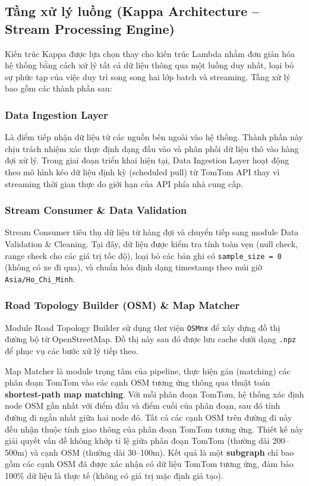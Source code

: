 \subsection{Tầng xử lý luồng (Kappa Architecture -- Stream Processing Engine)}

Kiến trúc Kappa được lựa chọn thay cho kiến trúc Lambda nhằm đơn giản hóa hệ thống bằng cách xử lý tất cả dữ liệu thông qua một luồng duy nhất, loại bỏ sự phức tạp của việc duy trì song song hai lớp batch và streaming. Tầng xử lý bao gồm các thành phần sau:

\subsubsection{Data Ingestion Layer}
Là điểm tiếp nhận dữ liệu từ các nguồn bên ngoài vào hệ thống. Thành phần này chịu trách nhiệm xác thực định dạng đầu vào và phân phối dữ liệu thô vào hàng đợi xử lý. Trong giai đoạn triển khai hiện tại, Data Ingestion Layer hoạt động theo mô hình kéo dữ liệu định kỳ (scheduled pull) từ TomTom API thay vì streaming thời gian thực do giới hạn của API phía nhà cung cấp.

\subsubsection{Stream Consumer \& Data Validation}
Stream Consumer tiêu thụ dữ liệu từ hàng đợi và chuyển tiếp sang module Data Validation \& Cleaning. Tại đây, dữ liệu được kiểm tra tính toàn vẹn (null check, range check cho các giá trị tốc độ), loại bỏ các bản ghi có \texttt{sample\_size = 0} (không có xe đi qua), và chuẩn hóa định dạng timestamp theo múi giờ \texttt{Asia/Ho\_Chi\_Minh}.

\subsubsection{Road Topology Builder (OSM) \& Map Matcher}
Module Road Topology Builder sử dụng thư viện \texttt{OSMnx} để xây dựng đồ thị đường bộ từ OpenStreetMap. Đồ thị này sau đó được lưu cache dưới dạng \texttt{.npz} để phục vụ các bước xử lý tiếp theo.

Map Matcher là module trọng tâm của pipeline, thực hiện gán (matching) các phân đoạn TomTom vào các cạnh OSM tương ứng thông qua thuật toán \textbf{shortest-path map matching}. Với mỗi phân đoạn TomTom, hệ thống xác định node OSM gần nhất với điểm đầu và điểm cuối của phân đoạn, sau đó tính đường đi ngắn nhất giữa hai node đó. Tất cả các cạnh OSM trên đường đi này đều nhận thuộc tính giao thông của phân đoạn TomTom tương ứng. Thiết kế này giải quyết vấn đề không khớp tỉ lệ giữa phân đoạn TomTom (thường dài 200--500m) và cạnh OSM (thường dài 30--100m). Kết quả là một \textbf{subgraph} chỉ bao gồm các cạnh OSM đã được xác nhận có dữ liệu TomTom tương ứng, đảm bảo 100\% dữ liệu là thực tế (không có giá trị mặc định giả tạo).

